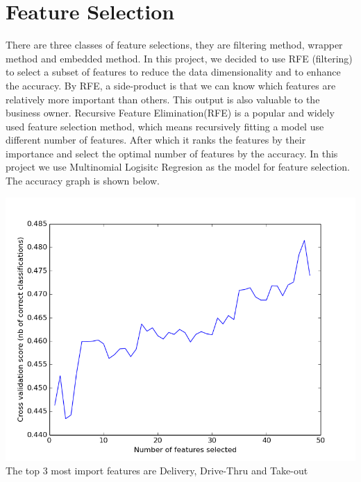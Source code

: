 \documentclass{article}
\begin{document}
\section{Feature Selection}
There are three classes of feature selections, they are filtering method, wrapper method and embedded method. In this project, we decided to use RFE (filtering) to select a subset of features to reduce the data dimensionality and to enhance the accuracy. By RFE, a side-product is that we can know which features are relatively more important than others. This output is also valuable to the business owner.
Recursive Feature Elimination(RFE) is a popular and widely used feature selection method, which means recursively fitting a model use different number of features. After which it ranks the features by their importance and select the optimal number of features by the accuracy.
In this project we use Multinomial Logisitc Regresion as the model for feature selection. The accuracy graph is shown below.
\graphicspath{ {images/} }
\includegraphics[scale=0.4]{RFEMLR}
The top 3 most import features are Delivery, Drive-Thru and Take-out
\end{document}
